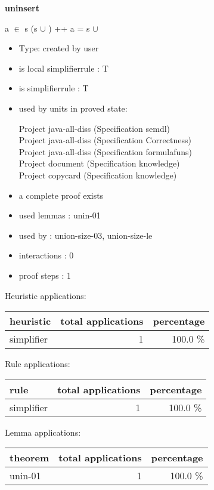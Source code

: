 \documentclass[a4paper]{article}
\begin{document}
{\LARGE\bf uninsert}\label{lemma-uninsert}

\medskip

 \Fol a $\in$ s \Imp (s $\cup$ ) ++ a = s $\cup$ 

\begin{itemize}

\item Type: created by user

\item is local simplifierrule : T
\item is simplifierrule : T
\item used by units in proved state:

Project java-all-diss (Specification semdl) \\
Project java-all-diss (Specification Correctness) \\
Project java-all-diss (Specification formulafuns) \\
Project document (Specification knowledge) \\
Project copycard (Specification knowledge)
\item       a complete proof exists
\item       used lemmas  : unin-01
\item       used by      : union-size-03, union-size-le
\item       interactions : 0
\item       proof steps  : 1
\end{itemize}

\medskip


Heuristic applications:

\begin{supertabular}{l|r|r}
heuristic	& total applications & percentage \\ \hline
simplifier & 1 & 100.0 \% \\

\end{supertabular}

Rule applications:

\begin{supertabular}{l|r|r}
rule	        & total applications & percentage \\ \hline
simplifier & 1 & 100.0 \% \\

\end{supertabular}

Lemma applications:

\begin{supertabular}{l|r|r}
theorem	        & total applications & percentage \\ \hline
unin-01 & 1 & 100.0 \% \\

\end{supertabular}
\pagebreak
\end{document}
